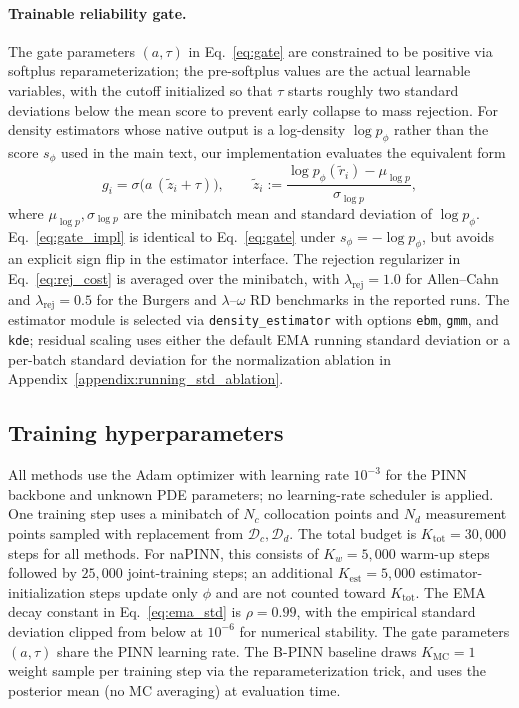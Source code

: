 \documentclass{article}
\theoremstyle{plain}
\theoremstyle{definition}
\theoremstyle{remark}
\begin{document}
\paragraph{Trainable reliability gate.}
The gate parameters $(a, \tau)$ in Eq.~\eqref{eq:gate} are constrained to be
positive via softplus reparameterization; the pre-softplus values are the
actual learnable variables, with the cutoff initialized so that $\tau$
starts roughly two standard deviations below the mean score to prevent
early collapse to mass rejection. For density estimators whose native output
is a log-density $\log p_\phi$ rather than the score $s_\phi$ used in the
main text, our implementation evaluates the equivalent form
\begin{equation}
g_i = \sigma\!\big(a\,(\tilde z_i + \tau)\big), \qquad
\tilde z_i := \frac{\log p_\phi(\tilde r_i) - \mu_{\log p}}{\sigma_{\log p}},
\label{eq:gate_impl}
\end{equation}
where $\mu_{\log p}, \sigma_{\log p}$ are the minibatch mean and standard
deviation of $\log p_\phi$. Eq.~\eqref{eq:gate_impl} is identical to
Eq.~\eqref{eq:gate} under $s_\phi = -\log p_\phi$, but avoids an explicit
sign flip in the estimator interface. The rejection regularizer in
Eq.~\eqref{eq:rej_cost} is averaged over the minibatch, with
$\lambda_{\mathrm{rej}}=1.0$ for Allen--Cahn and $\lambda_{\mathrm{rej}}=0.5$
for the Burgers and $\lambda$--$\omega$ RD benchmarks in the reported runs.
The estimator module is selected via \texttt{density\_estimator} with
options \texttt{ebm}, \texttt{gmm}, and \texttt{kde}; residual scaling uses
either the default EMA running standard deviation or a per-batch standard
deviation for the normalization ablation in
Appendix~\ref{appendix:running_std_ablation}.

\subsection{Training hyperparameters}
\label{appendix:training_hp}
All methods use the Adam optimizer with learning rate $10^{-3}$ for the PINN
backbone and unknown PDE parameters; no learning-rate scheduler is applied.
One training step uses a minibatch of $N_c$ collocation points and $N_d$
measurement points sampled with replacement from $\mathcal{D}_c, \mathcal{D}_d$.
The total budget is $K_{\text{tot}}=30{,}000$ steps for all methods.
For naPINN, this consists of $K_w = 5{,}000$ warm-up steps followed by
$25{,}000$ joint-training steps; an additional $K_{\text{est}}=5{,}000$
estimator-initialization steps update only $\phi$ and are not counted toward
$K_{\text{tot}}$. The EMA decay constant in Eq.~\eqref{eq:ema_std} is
$\rho = 0.99$, with the empirical standard deviation clipped from below at
$10^{-6}$ for numerical stability.
The gate parameters $(a, \tau)$ share the PINN learning rate.
The B-PINN baseline draws $K_{\text{MC}}=1$ weight sample per training step
via the reparameterization trick, and uses the posterior mean (no MC averaging)
at evaluation time.
\end{document}
